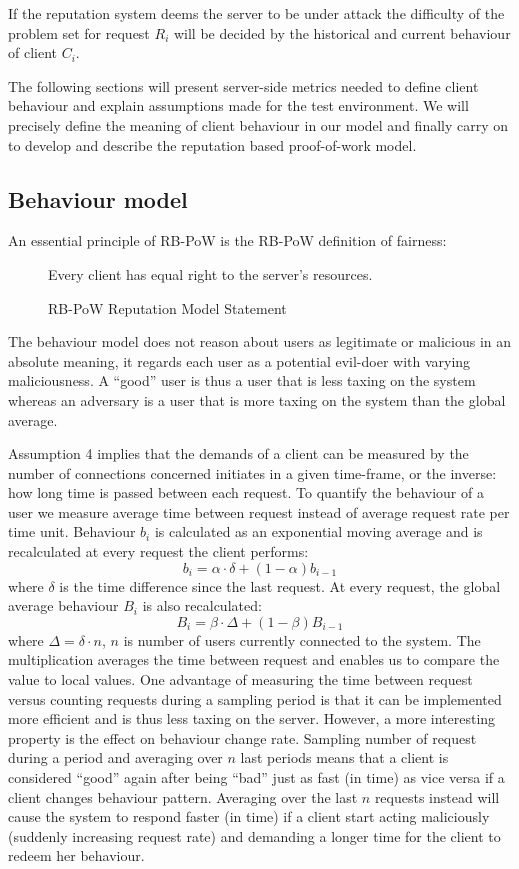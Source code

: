 If the reputation system deems the server to be under attack the difficulty of the problem set for request $R_i$ will be decided by the historical and current behaviour of client $C_i$. 

The following sections will present server-side metrics needed to define client behaviour and explain assumptions made for the test environment. 
We will precisely define the meaning of client behaviour in our model and finally carry on to develop and describe the reputation based proof-of-work model.





\subsection{Behaviour model}\label{tab:behaviourmodel}
An essential principle of RB-PoW is the RB-PoW definition of fairness:
\begin{figure}[H]
\begin{GrayBox}[0.65\textwidth]
Every client has equal right to the server's resources.
\end{GrayBox}
\caption{RB-PoW Reputation Model Statement}
\end{figure}
The behaviour model does not reason about users as legitimate or malicious in an absolute meaning, it regards each user as a potential evil-doer with varying maliciousness. A ``good'' user is thus a user that is less taxing on the system whereas an adversary is a user that is more taxing on the system than the global average.  

Assumption 4 implies that the demands of a client can be measured by the number of connections concerned initiates in a given time-frame, or the inverse: how long time is passed between each request. 
To quantify the behaviour of a user we measure average time between request instead of average request rate per time unit. Behaviour $b_i$ is calculated as an exponential moving average and is recalculated at every request the client performs:
 $$ b_{i} = \alpha\cdot\delta + (1-\alpha)b_{i-1} $$
where $\delta$ is the time difference since the last request. At every request, the global average behaviour $B_i$ is also recalculated:
$$ B_{i} = \beta\cdot\Delta + (1-\beta)B_{i-1} $$
where $\Delta = \delta \cdot n$, $n$ is number of users currently connected to the system. The multiplication averages the time between request and enables us to compare the value to local values. 
One advantage of measuring the time between request versus counting requests during a sampling period is that it can be implemented more efficient and is thus less taxing on the server. However, a more interesting property is the effect on behaviour change rate. Sampling number of request during a period and averaging over $n$ last periods means that a client is considered ``good'' again after being ``bad'' just as fast (in time) as vice versa if a client changes behaviour pattern.
Averaging over the last $n$ requests instead will cause the system to respond faster (in time) if a client start acting maliciously (suddenly increasing request rate) and demanding a longer time for the client to redeem her behaviour.


